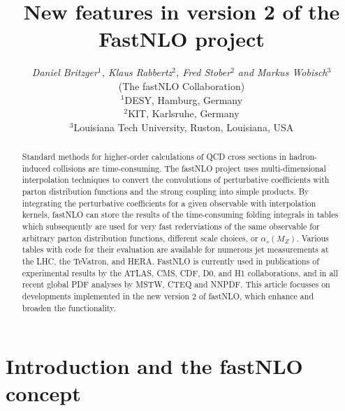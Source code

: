 \documentclass{DISproc}
\begin{document}
\title{New features in version 2 of the FastNLO project}

\author{{\slshape Daniel Britzger$^1$, Klaus Rabbertz$^2$, Fred Stober$^2$ and Markus Wobisch$^3$}\\
  (The fastNLO Collaboration)\\[1ex]
  $^1$DESY, Hamburg, Germany\\
  $^2$KIT, Karlsruhe, Germany\\
  $^3$Louisiana Tech University, Ruston, Louisiana, USA}



\doi %

\maketitle

\begin{abstract}
  Standard methods for higher-order calculations of QCD cross sections
  in hadron-induced collisions are time-consuming. The fastNLO project
  uses multi-dimensional interpolation techniques to convert the
  convolutions of perturbative coefficients with parton distribution
  functions and the strong coupling into simple products.  By
  integrating the perturbative coefficients for a given observable
  with interpolation kernels, fastNLO can store the results of the
  time-consuming folding integrals in tables which subsequently are
  used for very fast rederviations of the same observable for
  arbitrary parton distribution functions, different scale choices, or
  $\alpha_s(M_Z)$.  Various tables with code for their evaluation are
  available for numerous jet measurements at the LHC, the TeVatron,
  and HERA. FastNLO is currently used in publications of experimental
  results by the ATLAS, CMS, CDF, D0, and H1 collaborations, and in
  all recent global PDF analyses by MSTW, CTEQ and NNPDF.  This
  article focusses on developments implemented in the new version 2 of
  fastNLO, which enhance and broaden the functionality.
\end{abstract}



\section{Introduction and the fastNLO concept}
\end{document}
